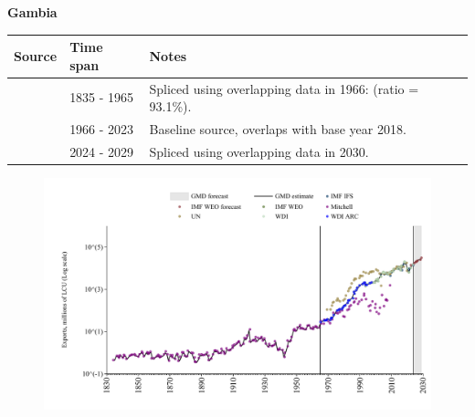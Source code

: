 \documentclass[12pt,a4paper,landscape]{article}
\begin{document}
\begin{adjustbox}{max totalsize={\paperwidth}{\paperheight},center}
\begin{minipage}[t][\textheight][t]{\textwidth}
\vspace*{0.5cm}
{}
\begin{center}
{\Large\bfseries Gambia}
\end{center}
\vspace{0.5cm}
\begin{table}[H]
\centering
\small
\begin{tabular}{|l|l|l|}
\hline
\textbf{Source} & \textbf{Time span} & \textbf{Notes} \\
\hline
\rowcolor{white}\cite{Mitchell}& 1835 - 1965 &Spliced using overlapping data in 1966: (ratio = 93.1\%).\\
\rowcolor{lightgray}\cite{WDI}& 1966 - 2023 &Baseline source, overlaps with base year 2018.\\
\rowcolor{white}\cite{IMF_WEO_forecast}& 2024 - 2029 &Spliced using overlapping data in 2030.\\
\hline
\end{tabular}
\end{table}
\begin{figure}[H]
\centering
\includegraphics[width=\textwidth,height=0.6\textheight,keepaspectratio]{graphs/GMB_exports.pdf}
\end{figure}
\end{minipage}
\end{adjustbox}
\end{document}
